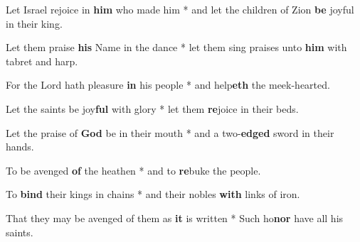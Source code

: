 \begin{multicols}{2}
	Let Israel rejoice in \textbf{him} who made him * and let the children of Zion \textbf{be} joyful in their king.
	
	Let them praise \textbf{his} Name in the dance * let them sing praises unto \textbf{him} with tabret and harp.
	
	For the Lord hath pleasure \textbf{in} his people * and help\textbf{eth} the meek-hearted.
	
	Let the saints be joy\textbf{ful} with glory * let them \textbf{re}joice in their beds.
	
	Let the praise of \textbf{God} be in their mouth * and a two-\textbf{edged} sword in their hands.
	
	To be avenged \textbf{of} the heathen * and to \textbf{re}buke the people.
	
	To \textbf{bind} their kings in chains * and their nobles \textbf{with} links of iron.
	
	That they may be avenged of them as \textbf{it} is written * Such ho\textbf{nor} have all his saints.
\end{multicols}